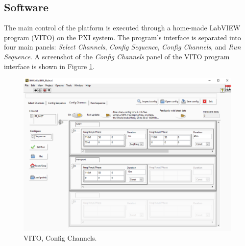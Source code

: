 \subsection{Software}

The main control of the platform is executed through a home-made LabVIEW program (VITO) on the PXI system. The program's interface is separated into four main panels: \textit{Select Channels}, \textit{Config Sequence}, \textit{Config Channels}, and \textit{Run Sequence}. A screenshot of the \textit{Config Channels} panel of the VITO program interface is shown in Figure \ref{fig:ch1_vito_channels}.

\begin{figure}[ht]
    \centering
    \includegraphics[width=0.98\columnwidth]{images/chapter_1/vito_channels.png}
    \caption{VITO, Config Channels.}
    \label{fig:ch1_vito_channels}
\end{figure}


